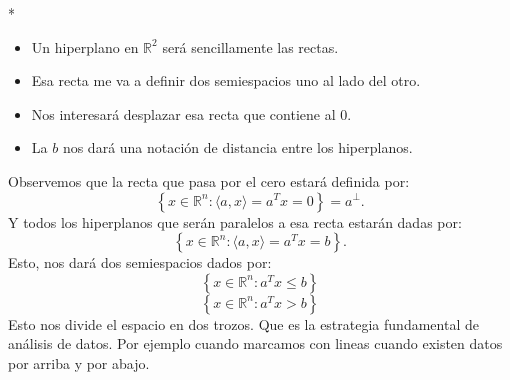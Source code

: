 \begin{paracol}{2}
\switchcolumn[1]*{\noindent\scriptsize
\begin{center}
\end{center}
\begin{itemize}
    \item Un hiperplano en $\mathbb{R}^2$ será sencillamente las rectas.
    \item Esa recta me va a definir dos semiespacios uno al lado del otro.
    \item Nos interesará desplazar esa recta que contiene al $0$. 
    \item La $b$ nos dará una notación de distancia entre los hiperplanos.
\end{itemize}
}
\switchcolumn[0]\noindent
Observemos que la recta que pasa por el cero estará definida por:
    $$\left\{x\in \mathbb{R}^n : \langle a,x\rangle = a^T x = 0\right\} = a^\perp.$$
Y todos los hiperplanos que serán paralelos a esa recta estarán dadas por:
$$\left\{x\in \mathbb{R}^n : \langle a,x\rangle = a^T x = b\right\}.$$
 Esto, nos dará dos semiespacios dados por:
$$\left\{x\in \mathbb{R}^n : a^Tx\leq b\right\}$$
$$\left\{x\in \mathbb{R}^n : a^Tx > b\right\}$$
Esto nos divide el espacio en dos trozos. Que es la estrategia fundamental de análisis de datos. Por ejemplo cuando marcamos con lineas cuando existen datos por arriba y por abajo.


\end{paracol}
